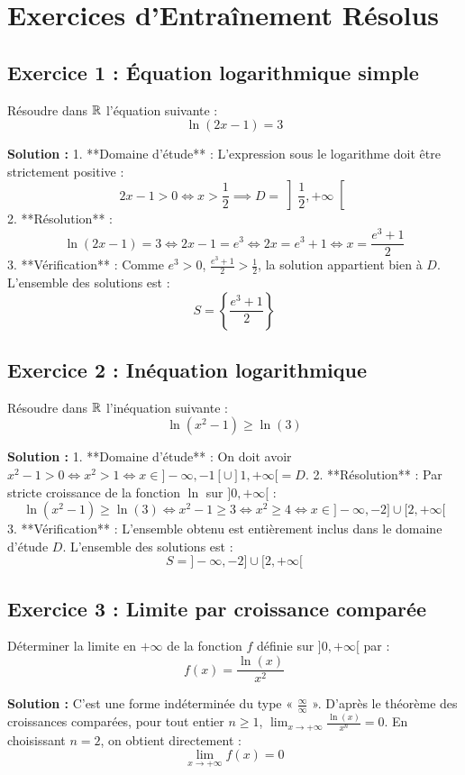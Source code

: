 \section{Exercices d'Entraînement Résolus}

\subsection*{Exercice 1 : Équation logarithmique simple}
Résoudre dans $\mathbb{R}$ l'équation suivante :
\[
\ln(2x - 1) = 3
\]

\textbf{Solution :}
1. **Domaine d'étude** : L'expression sous le logarithme doit être strictement positive :
   \[
   2x - 1 > 0 \iff x > \frac{1}{2} \implies D = \left] \frac{1}{2}, +\infty \right[
   \]
2. **Résolution** :
   \[
   \ln(2x - 1) = 3 \iff 2x - 1 = e^3 \iff 2x = e^3 + 1 \iff x = \frac{e^3 + 1}{2}
   \]
3. **Vérification** : Comme $e^3 > 0$, $\frac{e^3 + 1}{2} > \frac{1}{2}$, la solution appartient bien à $D$.
L'ensemble des solutions est :
\[
S = \left\{ \frac{e^3 + 1}{2} \right\}
\]

\subsection*{Exercice 2 : Inéquation logarithmique}
Résoudre dans $\mathbb{R}$ l'inéquation suivante :
\[
\ln(x^2 - 1) \ge \ln(3)
\]

\textbf{Solution :}
1. **Domaine d'étude** : On doit avoir $x^2 - 1 > 0 \iff x^2 > 1 \iff x \in ]-\infty, -1[ \cup ]1, +\infty[ = D$.
2. **Résolution** : Par stricte croissance de la fonction $\ln$ sur $]0, +\infty[$ :
   \[
   \ln(x^2 - 1) \ge \ln(3) \iff x^2 - 1 \ge 3 \iff x^2 \ge 4 \iff x \in ]-\infty, -2] \cup [2, +\infty[
   \]
3. **Vérification** : L'ensemble obtenu est entièrement inclus dans le domaine d'étude $D$.
L'ensemble des solutions est :
\[
S = ]-\infty, -2] \cup [2, +\infty[
\]

\subsection*{Exercice 3 : Limite par croissance comparée}
Déterminer la limite en $+\infty$ de la fonction $f$ définie sur $]0, +\infty[$ par :
\[
f(x) = \frac{\ln(x)}{x^2}
\]

\textbf{Solution :}
C'est une forme indéterminée du type « $\frac{\infty}{\infty}$ ».
D'après le théorème des croissances comparées, pour tout entier $n \ge 1$, $\lim_{x \to +\infty} \frac{\ln(x)}{x^n} = 0$.
En choisissant $n = 2$, on obtient directement :
\[
\lim_{x \to +\infty} f(x) = 0
\]

